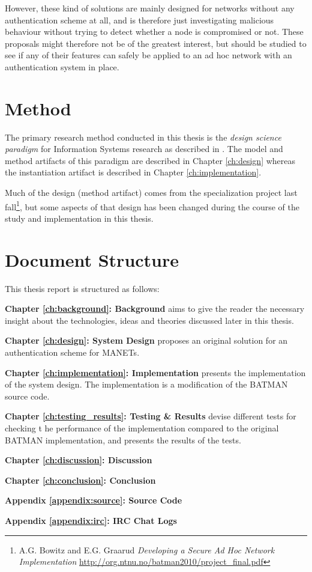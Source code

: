 However, these kind of solutions are mainly designed for networks without any
authentication scheme at all, and is therefore just investigating malicious
behaviour without trying to detect whether a node is compromised or not. These
proposals might therefore not be of the greatest interest, but should be studied
to see if any of their features can safely be applied to an ad hoc network with
an authentication system in place.

\section{Method}
The primary research method conducted in this thesis is the \emph{design
science paradigm} for Information Systems research as described in
\cite{hevner2003information}. The model and method artifacts of this paradigm
are described in Chapter \ref{ch:design} whereas the instantiation artifact is
described in Chapter \ref{ch:implementation}.

Much of the design (method artifact) comes from the specialization project last
fall\footnote{A.G. Bowitz and E.G. Graarud \textit{Developing a Secure Ad Hoc
Network Implementation} \url{http://org.ntnu.no/batman2010/project_final.pdf}},
but some aspects of that design has been changed during the course of the study
and implementation in this thesis.

\section{Document Structure}
This thesis report is structured as follows:

\textbf{Chapter \ref{ch:background}: Background} aims to give the reader the
necessary insight about the technologies, ideas and theories discussed later in
this thesis.

\textbf{Chapter \ref{ch:design}: System Design} proposes an original solution
for an authentication scheme for \acp{MANET}.

\textbf{Chapter \ref{ch:implementation}: Implementation} presents the
implementation of the system design. The implementation is a modification of the
\ac{BATMAN} source code.

\textbf{Chapter \ref{ch:testing_results}: Testing \& Results} devise different
tests for checking t he performance of the implementation compared to the
original \ac{BATMAN} implementation, and presents the results of the tests.

\textbf{Chapter \ref{ch:discussion}: Discussion}

\textbf{Chapter \ref{ch:conclusion}: Conclusion}

\textbf{Appendix \ref{appendix:source}: Source Code}

\textbf{Appendix \ref{appendix:irc}: IRC Chat Logs}